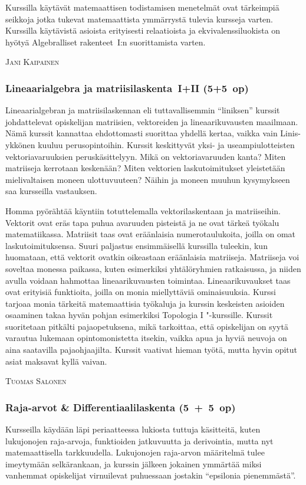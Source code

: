 \documentclass[../ala_hataile.tex]{subfiles}
\begin{document}
	Kurssilla käytävät matemaattisen todistamisen
	menetelmät ovat tärkeimpiä
	seikkoja jotka tukevat matemaattista ymmärrystä
	tulevia kursseja varten. Kurssilla
	käytävistä asioista erityisesti relaatioista ja
	ekvivalenssiluokista on hyötyä Algebralliset rakenteet~I:n
	suorittamista varten.
	
	\vspace{0.5cm}
	\noindent\textsc{Jani Kaipainen}
	
	\subsubsection*{Lineaarialgebra ja matriisilaskenta~I+II (5+5~op)}
	Lineaarialgebran ja matriisilaskennan
	eli tuttavallisemmin ``liniksen'' kurssit johdattelevat
	opiskelijan matriisien, vektoreiden
	ja lineaarikuvausten maailmaan. Nämä
	kurssit kannattaa ehdottomasti suorittaa
	yhdellä kertaa, vaikka vain Linis-ykkönen kuuluu perusopintoihin. Kurssit keskittyvät yksi- ja
	useampiulotteisten vektoriavaruuksien peruskäsittelyyn.
	Mikä on vektoriavaruuden
	kanta? Miten matriiseja kerrotaan keskenään?
	Miten vektorien laskutoimitukset
	yleistetään mielivaltaisen moneen ulottuvuuteen?
	Näihin ja moneen muuhun kysymykseen
	saa kursseilla vastauksen.
	
	Homma pyörähtää käyntiin totuttelemalla
	vektorilaskentaan ja matriiseihin.
	Vektorit ovat eräs tapa puhua avaruuden
	pisteistä ja ne ovat tärkeä työkalu matematiikassa.
	Matriisit taas ovat eräänlaisia
	numerotaulukoita, joilla on omat laskutoimituksensa.
	Suuri paljastus ensimmäisellä
	kurssilla tuleekin, kun huomataan,
	että vektorit ovatkin oikeastaan eräänlaisia
	matriiseja. Matriiseja voi soveltaa monessa
	paikassa, kuten esimerkiksi yhtälöryhmien
	ratkaisussa, ja niiden avulla voidaan hahmottaa
	lineaarikuvausten toimintaa. Lineaarikuvaukset taas ovat erityisiä funktioita,
	joilla on monia miellyttäviä ominaisuuksia.
	Kurssi tarjoaa monia tärkeitä matemaattisia
	työkaluja ja kurssin keskeisten
	asioiden osaaminen takaa hyvän pohjan
	esimerkiksi Topologia I "-kurssille. Kurssit
	suoritetaan pitkälti pajaopetuksena, mikä
	tarkoittaa, että opiskelijan on syytä varautua
	lukemaan opintomonistetta itsekin,
	vaikka apua ja hyviä neuvoja on aina saatavilla
	pajaohjaajilta. Kurssit vaativat hieman
	työtä, mutta hyvin opitut asiat maksavat
	kyllä vaivan.
	
	\vspace{0.5cm}
	\noindent\textsc{Tuomas Salonen}
	
	\subsubsection*{Raja-arvot \& Differentiaalilaskenta (5~+~5~op)}
	Kursseilla käydään läpi periaatteessa
	lukiosta tuttuja käsitteitä, kuten lukujonojen
	raja-arvoja, funktioiden jatkuvuutta
	ja derivointia, mutta nyt matemaattisella
	tarkkuudella. Lukujonojen raja-arvon määritelmä
	tulee imeytymään selkärankaan, ja
	kurssin jälkeen jokainen ymmärtää miksi
	vanhemmat opiskelijat virnuilevat puhuessaan
	jostakin ``epsilonia pienemmästä''.
	
\end{document}
